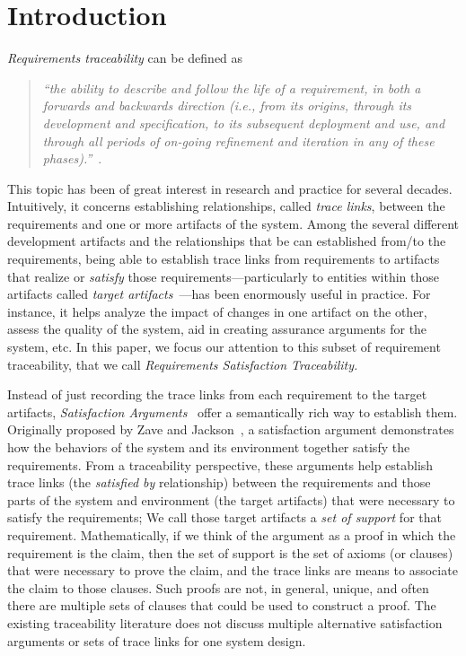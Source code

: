 \section{Introduction}

\emph{Requirements traceability} can be defined as
\begin{quotation}
\textit{``the ability to describe and follow the life of a requirement, in both a forwards and backwards direction (i.e., from its origins, through its development and specification, to its subsequent deployment and use, and through all periods of on-going refinement and iteration in any of these phases).''}~\cite{gotel}.
\end{quotation}
This topic has been of great interest in research and practice for several decades. Intuitively, it concerns establishing relationships, called \emph{trace links}, between the requirements and one or more artifacts of the system. Among the several different development artifacts and the relationships that be can established from/to the requirements, being able to establish trace links from requirements to artifacts that realize or \emph{satisfy} those requirements---particularly to entities within those artifacts called \emph{target artifacts}~\cite{gotel2012traceability}---has been enormously useful in practice. For instance, it helps analyze the impact of changes in one artifact on the other, assess the quality of the system, aid in creating assurance arguments for the system, etc. In this paper, we focus our attention to this subset of requirement traceability, that we call \emph{Requirements Satisfaction Traceability.}

Instead of just recording the trace links from each requirement to the target artifacts, \emph{Satisfaction Arguments}~\cite{zave1997four} offer a semantically rich way to establish them. Originally proposed by Zave and Jackson~\cite{zave1997four}, a satisfaction argument demonstrates how the behaviors of the system and its environment together satisfy the requirements. From a traceability perspective, these arguments help establish trace links (the \emph{satisfied by} relationship) between the requirements and those parts of the system and environment (the target artifacts) that were necessary to satisfy the requirements; We call those target artifacts a \emph{set of support} for that requirement. Mathematically, if we think of the argument as a proof in which the requirement is the claim, then the set of support is the set of axioms (or clauses) that were necessary to prove the claim, and the trace links are means to associate the claim to those clauses. Such proofs are not, in general, unique, and often there are multiple sets of clauses that could be used to construct a proof.  The existing traceability literature does not discuss multiple alternative satisfaction arguments or sets of trace links for one system design.


